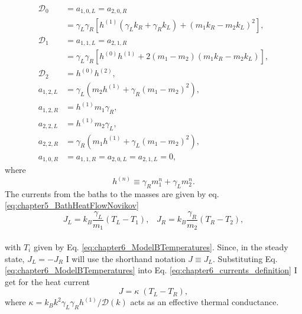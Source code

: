   \begin{align}
    \mathcal{D}_0 &= a_{1,0,L} = a_{2,0,R}
    \nonumber\\
    & = \gamma _L \gamma _R\! \left[h^{(1)}\! \left(\gamma_L k_R +\gamma_R k_L \right)+\left(m_1 k_R-m_2 k_L\right)^2\right]\!,
    \nonumber\\
    \mathcal{D}_1 &= a_{1,1,L} = a_{2,1,R}
    \nonumber\\
    &= \gamma _L \gamma _R\! \left[h^{(0)} h^{(1)}\!+2 \left(m_1-m_2\right) \left(m_1 k_R-m_2 k_L\right)\right]\!,
    \nonumber\\
    \mathcal{D}_2 &= h^{(0)} h^{(2)},\nonumber
    \\
    a_{1,2,L} &= \gamma _L \left(m_2 h^{(1)} + \gamma_R (m_1 - m_2)^2 \right),\nonumber
    \\
    a_{1,2,R} &= h^{(1)} m_1 \gamma_R,\nonumber
    \\
    a_{2,2,L} &= h^{(1)} m_2 \gamma_L,\nonumber
    \\
    a_{2,2,R} &= \gamma _R \left( m_1 h^{(1)} + \gamma_L (m_1-m_2)^2 \right),\nonumber
    \\
    a_{1,0,R} &= a_{1,1,R} = a_{2,0,L} = a_{2,1,L} = 0,
    \label{eq:chapter6_SolutionPolynomialCoefficients}
  \end{align}
%
where
%
\begin{equation}
h^{(n)}\equiv \gamma_R m_1^n + \gamma_L m_2^n.
\end{equation}
%
The currents from the baths to the masses are given by eq. \eqref{eq:chapter5_BathHeatFlowNovikov}
%
\begin{equation}
    J_L = k_B \frac{\gamma_L}{m_1} \left( T_L - T_1 \right),\;\;\;
    J_R = k_B \frac{\gamma_R}{m_2} \left( T_R - T_2 \right),
    \label{eq:chapter6_currents_definition}
\end{equation}
\\
%
with $T_i$ given by Eq. \eqref{eq:chapter6_ModelBTemperatures}. Since, in the steady state, $J_L = -J_R$ I will use the shorthand notation $J \equiv J_L$. Substituting Eq. \eqref{eq:chapter6_ModelBTemperatures} into Eq.  \eqref{eq:chapter6_currents_definition} I get for the heat current
%
\begin{equation}
  J = \kappa\;(T_L - T_R),
  \label{eq:chapter6_CurrentsInModelB}
\end{equation}
%
where $\kappa = k_B {k^2\gamma_L \gamma_R h^{(1)}}/{\mathcal{D}(k)}$ acts as an effective thermal conductance.
%
%
%
%
